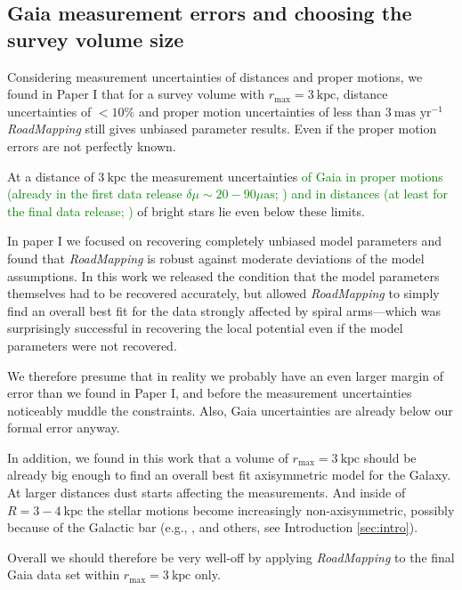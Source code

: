 \documentclass[iop,revtex4,numberedappendix,appendixfloats]{emulateapj}
\newcommand{\RM}{{\sl RoadMapping}}
\newcommand{\NEW}[1]{\textcolor{Green}{#1}}
\newcommand{\OLD}[1]{}
\begin{document}
\subsection{Gaia measurement errors and choosing the survey volume size} \label{sec:discussion_choosing_SV}

Considering measurement uncertainties of distances and proper motions, we found in Paper I that for a survey volume with $r_\text{max} = 3~\text{kpc}$, distance uncertainties of $<10\%$ and proper motion uncertainties of less than $3~\text{mas yr}^{-1}$ \RM{} still gives unbiased parameter results. Even if the proper motion errors are not perfectly known. 

At a distance of $3~\text{kpc}$ the measurement uncertainties \NEW{of Gaia in proper motions (already in the first data release $\delta \mu \sim 20-90 \mu\text{as}$; \citealt{2014A&A...571A..85M,2015A&A...574A.115M}) and in distances (at least for the final data release; \citealt{2014EAS....67...23D})} of bright stars \OLD{in (at least the final data release of) Gaia} lie even below these limits. 

In paper I we focused on recovering completely unbiased model parameters and found that \RM{} is robust against moderate deviations of the model assumptions. In this work we released the condition that the model parameters themselves had to be recovered accurately, but allowed \RM{} to simply find an overall best fit for the data strongly affected by spiral arms---which was surprisingly successful in recovering the local potential even if the model parameters were not recovered. 

We therefore presume that in reality we probably have an even larger margin of error than we found in Paper I, and before the measurement uncertainties noticeably muddle the constraints. Also, Gaia uncertainties are already below our formal error anyway.

In addition, we found in this work that a volume of $r_\text{max} = 3~\text{kpc}$ should be already big enough to find an overall best fit axisymmetric model for the Galaxy. At larger distances dust starts affecting the measurements. And inside of $R=3-4~\text{kpc}$ the stellar motions become increasingly non-axisymmetric, possibly because  of the Galactic bar (e.g., \citealt{2014ApJ...783..130R,2015ApJ...800...83B}, and others, see Introduction \ref{sec:intro}).

Overall we should therefore be very well-off by applying \RM{} to the final Gaia data set within $r_\text{max}=3~\text{kpc}$ only.
\end{document}
